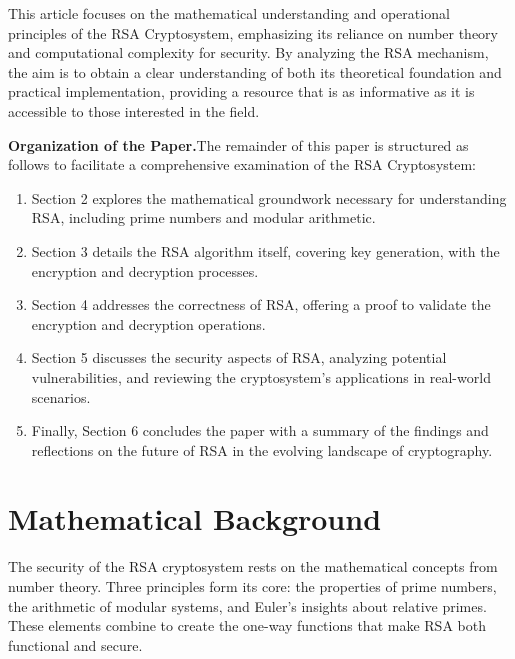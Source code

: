 \documentclass[11pt,a4paper]{article}
\numberwithin{equation}{section}
\begin{document}
This article focuses on the mathematical understanding and operational principles of the RSA Cryptosystem, emphasizing its reliance on number theory and computational complexity for security. By analyzing the RSA mechanism, the aim is to obtain a clear understanding of both its theoretical foundation and practical implementation, providing a resource that is as informative as it is accessible to those interested in the field.

\textbf{Organization of the Paper.}The remainder of this paper is structured as follows to facilitate a comprehensive examination of the RSA Cryptosystem:
\begin{enumerate}
    \item Section 2 explores the mathematical groundwork necessary for understanding RSA, including prime numbers and modular arithmetic.
    \item Section 3 details the RSA algorithm itself, covering key generation, with the encryption and decryption processes.
    \item Section 4 addresses the correctness of RSA, offering a proof to validate the encryption and decryption operations.
    \item Section 5 discusses the security aspects of RSA, analyzing potential vulnerabilities, and reviewing the cryptosystem’s applications in real-world scenarios.
    \item Finally, Section 6 concludes the paper with a summary of the findings and reflections on the future of RSA in the evolving landscape of cryptography.
\end{enumerate}

\newpage

\section{Mathematical Background}
The security of the RSA cryptosystem rests on the mathematical concepts from number theory. Three principles form its core: the properties of prime numbers, the arithmetic of modular systems, and Euler's insights about relative primes. These elements combine to create the one-way functions that make RSA both functional and secure.
\end{document}
